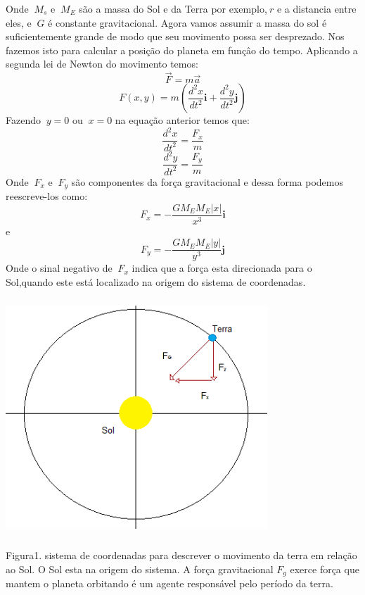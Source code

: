 \documentclass[a4paper]{article} %
\begin{document}
Onde $\ M_s$ e $\ M_E$ s\~{a}o a massa do Sol e da Terra por exemplo,$\ r$ e a distancia entre eles, e $\ G$ \'{e} constante gravitacional. Agora vamos assumir a massa do sol \'{e} suficientemente grande de modo que seu movimento possa ser desprezado. Nos fazemos isto para calcular a posição do planeta em fun\c{c}\^{a}o do tempo. Aplicando a segunda lei de Newton do movimento temos: 
\[\overrightarrow{F} = m\overrightarrow{a}\]
\[F(x,y) = m\left(\frac{d^{2}x}{dt^2}\textbf{i} + \frac{d^{2}y}{dt^2}\textbf{j}\right)\]
Fazendo $\ y = 0 $ ou $\ x = 0$ na equa\c{c}\~{a}o anterior temos que:
\[\frac{d^2x}{dt^2} = \frac{F_x}{m}\]
\[\frac{d^2y}{dt^2} = \frac{F_y}{m}\]
Onde $\ F_x$ e $\ F_y$ s\~{a}o componentes da for\c{c}a gravitacional e dessa forma podemos reescreve-los como:
\begin{equation}
F_x = -\frac{GM_EM_E|x|}{x^3}\textbf{i}
\end{equation}
e 
\begin{equation}
F_y = - \frac{GM_EM_E|y|}{y^3}\textbf{j}
\end{equation}
Onde o sinal negativo de $\ F_x$ indica que a for\c{c}a esta direcionada para o Sol,quando este est\'{a} localizado na origem do sistema de coordenadas.

\begin{center}
	\includegraphics[width=3.87in, height=3.50in, keepaspectratio=false]{image1.png}
	
	\scriptsize{ Figura1. sistema de coordenadas para descrever o movimento da terra em relação ao Sol. O Sol esta na origem do sistema. A força gravitacional $F_g$ exerce força que mantem o planeta orbitando é um agente responsável pelo período da terra. }
\end{center}
\end{document}
